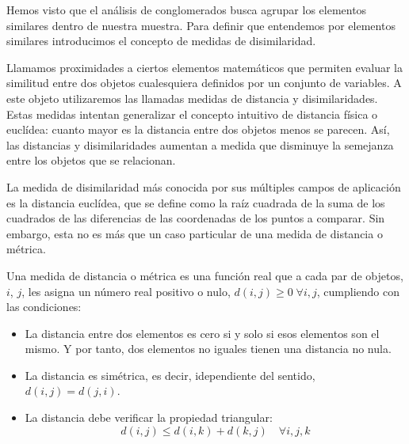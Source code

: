 Hemos visto que el an\'alisis de conglomerados busca agrupar los elementos similares dentro de nuestra muestra. Para definir que entendemos por elementos similares introducimos el concepto de medidas de disimilaridad.

Llamamos proximidades a ciertos elementos matem\'aticos que permiten evaluar la similitud entre dos objetos cualesquiera definidos por un conjunto de variables. A este objeto utilizaremos las llamadas medidas de distancia y disimilaridades. Estas medidas intentan generalizar el concepto intuitivo de distancia f\'isica o eucl\'idea: cuanto mayor es la distancia entre dos objetos menos se parecen. As\'i, las distancias y disimilaridades aumentan a medida que disminuye la semejanza entre los objetos que se relacionan.

La medida de disimilaridad m\'as conocida por sus m\'ultiples campos de aplicaci\'on es la distancia eucl\'idea, que se define como la ra\'iz cuadrada de la suma de los cuadrados de las diferencias de las coordenadas de los puntos a comparar. Sin embargo, esta no es m\'as que un caso particular de una medida de distancia o m\'etrica.

\begin{definicion}
Una medida de distancia o m\'etrica es una funci\'on real que a cada par de objetos, $i$, $j$, les asigna un n\'umero real positivo o nulo, $d(i,j)\geq0\;\forall i,j$, cumpliendo con las condiciones:
\begin{itemize}
\item La distancia entre dos elementos es cero si y solo si esos elementos son el mismo. Y por tanto, dos elementos no iguales tienen una distancia no nula.
\item La distancia es sim\'etrica, es decir, idependiente del sentido, $d(i,j)=d(j,i)$.
\item La distancia debe verificar la propiedad triangular:
\[d(i,j)\leq d(i,k)+d(k,j)\quad\forall i,j,k\]
\end{itemize}
\end{definicion}





